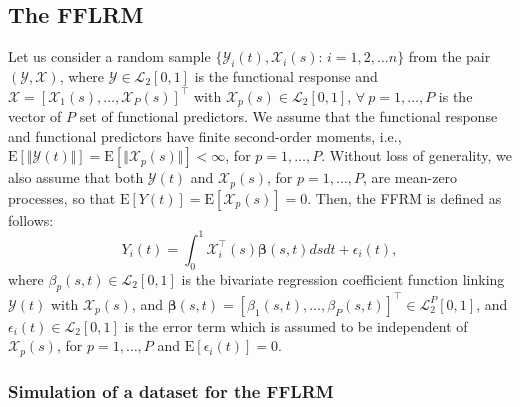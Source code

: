 \subsection*{The FFLRM}

Let us consider a random sample $\lbrace \mathcal{Y}_i(t), \bm{\mathcal{X}}_i(s)$: $i = 1, 2, \ldots n \rbrace$ from the pair $(\mathcal{Y}, \bm{\mathcal{X}})$, where $\mathcal{Y} \in \mathcal{L}_2 [0,1]$ is the functional response and $\bm{\mathcal{X}} = [\mathcal{X}_1(s), \ldots, \mathcal{X}_P(s)]^\top$ with $\mathcal{X}_p(s) \in \mathcal{L}_2[0,1]$, $\forall~p = 1, \ldots, P$ is the vector of $P$ set of functional predictors. We assume that the functional response and functional predictors have finite second-order moments, i.e., $\text{E}[\Vert \mathcal{Y}(t) \Vert] = \text{E}[\Vert \mathcal{X}_p(s) \Vert] < \infty$, for $p = 1, \ldots, P$. Without loss of generality, we also assume that both $\mathcal{Y}(t)$ and $\mathcal{X}_p(s)$, for $p = 1, \ldots, P$, are mean-zero processes, so that $\text{E}[Y(t)] = \text{E}[\mathcal{X}_p(s)] = 0$. Then, the FFRM is defined as follows:
\begin{equation}\label{eq:fof}
Y_i(t) = \int_0^1 \bm{\mathcal{X}}_i^\top(s) \bm{\beta}(s,t) ds dt + \epsilon_i(t),
\end{equation}
where $\beta_p(s,t) \in \mathcal{L}_2[0,1]$ is the bivariate regression coefficient function linking $\mathcal{Y}(t)$ with $\mathcal{X}_p(s)$, and $\bm{\beta}(s,t) = [ \beta_1(s,t), \ldots, \beta_P(s,t) ]^\top \in \mathcal{L}_2^P[0,1]$, and $\epsilon_i(t) \in \mathcal{L}_2[0,1]$ is the error term which is assumed to be independent of $\mathcal{X}_p(s)$, for $p = 1, \ldots, P$ and $\text{E}[\epsilon_i(t)] = 0$.

\subsubsection*{Simulation of a dataset for the FFLRM}

